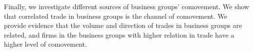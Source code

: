 {Finally, we investigate different  sources of business groups' comovement. We show that correlated trade in business groups is the channel of comovement. We provide evidence that the volume and direction of trades in business groups are related, and firms in the business groups with higher relation in trade have a higher level of comovement.}
	
	
	
	
